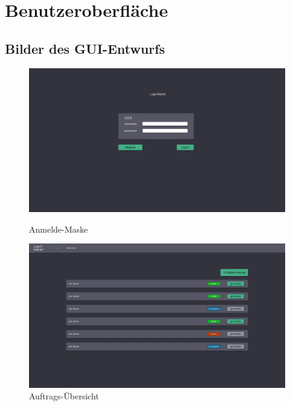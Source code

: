 \section{Benutzeroberfläche}

\subsection{Bilder des GUI-Entwurfs}
\begin{figure}[H]
    \centering

        \includegraphics[width=\textwidth]{images-interface/Loginv1.png}
        \caption{Anmelde-Maske}
        \label{fig:login}
   
        \includegraphics[width=\textwidth]{images-interface/Job-Viewv1.png}
        \caption{Auftrags-Übersicht}
        \label{fig:viewjobs}
  
\end{figure}


